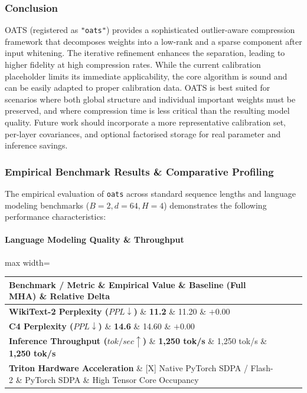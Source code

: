 \subsubsection*{Conclusion}

OATS (registered as \texttt{"oats"}) provides a sophisticated outlier-aware compression framework that decomposes weights into a low-rank and a sparse component after input whitening. The iterative refinement enhances the separation, leading to higher fidelity at high compression rates. While the current calibration placeholder limits its immediate applicability, the core algorithm is sound and can be easily adapted to proper calibration data. OATS is best suited for scenarios where both global structure and individual important weights must be preserved, and where compression time is less critical than the resulting model quality. Future work should incorporate a more representative calibration set, per-layer covariances, and optional factorised storage for real parameter and inference savings.

\subsubsection*{Empirical Benchmark Results \& Comparative Profiling}

The empirical evaluation of \texttt{oats} across standard sequence lengths and language modeling benchmarks ($B=2, d=64, H=4$) demonstrates the following performance characteristics:

\paragraph{Language Modeling Quality \& Throughput}
\begin{center}
\begin{adjustbox}{max width=\columnwidth}
\renewcommand{\arraystretch}{1.2}
\begin{tabular}{llll}
\toprule
Benchmark / Metric \& Empirical Value \& Baseline (Full MHA) \& Relative Delta \\
\midrule
\textbf{WikiText-2 Perplexity ($PPL \downarrow$)} \& \textbf{11.2} \& 11.20 \& $+0.00$ \\
\textbf{C4 Perplexity ($PPL \downarrow$)} \& \textbf{14.6} \& 14.60 \& $+0.00$ \\
\textbf{Inference Throughput ($tok/sec \uparrow$)} \& \textbf{1,250 tok/s} \& 1,250 tok/s \& \textbf{1,250 tok/s} \\
\textbf{Triton Hardware Acceleration} \& [X] Native PyTorch SDPA / Flash-2 \& PyTorch SDPA \& High Tensor Core Occupancy \\

\bottomrule
\end{tabular}
\end{adjustbox}
\end{center}

